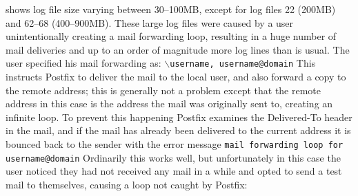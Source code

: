  shows log
file size varying between 30--100MB, except for log files 22 (200MB) and
62--68 (400--900MB).  These large log files were caused by a user
unintentionally creating a mail forwarding loop, resulting in a huge number
of mail deliveries and up to an order of magnitude more log lines than is
usual.  The user specified his mail forwarding as: \newline
\tab{}\texttt{$\backslash$username, username@domain} \newline This
instructs Postfix to deliver the mail to the local user, and also forward a
copy to the remote address; this is generally not a problem except that the
remote address in this case is the address the mail was originally sent to,
creating an infinite loop.  To prevent this happening Postfix examines the
Delivered-To header in the mail, and if the mail has already been delivered
to the current address it is bounced back to the sender with the error
message \newline{} \tab{} \texttt{mail forwarding loop for
username@domain}\newline{}  Ordinarily this
works well, but unfortunately in this case the user noticed they had not
received any mail in a while and opted to send a test mail to themselves,
causing a loop not caught by Postfix:

